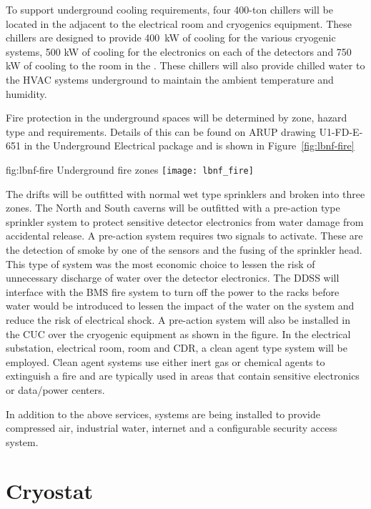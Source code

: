 To support underground cooling requirements, four 400-ton chillers
will be located in the  adjacent to the electrical room and
cryogenics equipment.  These chillers are designed to provide \SI{400}{\kilo\watt}
of cooling for the various cryogenic systems, 500 kW of cooling for
the electronics on each of the detectors and 750 kW of cooling to the
 room in the .  These chillers will also provide chilled water
to the HVAC systems underground to maintain the ambient temperature
and humidity.

Fire protection in the underground spaces will be determined by zone,
hazard type and requirements.  Details of this can be found on ARUP
drawing U1-FD-E-651 in the Underground Electrical package and is shown
in Figure~\ref{fig:lbnf-fire}
\begin{dunefigure}{fig:lbnf-fire}
  {Underground fire zones}
 \texttt{[image: lbnf\_fire]}
\end{dunefigure}
The drifts will be outfitted with normal wet type sprinklers and
broken into three zones.  The North and South caverns will be outfitted
with a pre-action type sprinkler system to protect sensitive detector
electronics from water damage from accidental release.  A pre-action
system requires two signals to activate.  These are the detection of
smoke by one of the sensors and the fusing of the sprinkler
head.  This type of system was the most economic choice to lessen the
risk of unnecessary discharge of water over the detector electronics.
The DDSS will interface with the BMS fire system to turn off the power
to the racks before water would be introduced to lessen the impact of
the water on the system and reduce the risk of electrical shock.  A
pre-action system will also be installed in the CUC over the cryogenic
equipment as shown in the figure.  In the electrical substation,
electrical room,  room and CDR, a clean agent type system will be
employed.  Clean agent systems use either inert gas or chemical agents
to extinguish a fire and are typically used in areas that contain
sensitive electronics or data/power centers.

In addition to the above services, systems are being installed to
provide compressed air, industrial water, internet and a configurable
security access system.

\section{Cryostat}
\label{sec:fdsp-coord-cryostat}

